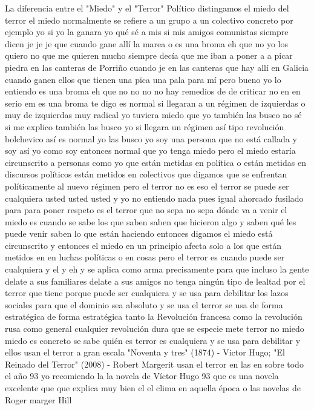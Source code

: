 La diferencia entre el "Miedo" y el "Terror" Político
distingamos el miedo del terror el miedo normalmente se refiere a un grupo a un colectivo concreto por ejemplo yo
si yo la ganara yo qué sé a mis si mis amigos comunistas siempre dicen je je je
que cuando gane allí la marea o es una broma eh que no yo los quiero no que me quieren mucho siempre decía que me iban a poner a a picar piedra
en las canteras de Porriño cuando je en las canteras que hay allí en Galicia cuando ganen ellos que tienen una pica
una pala para mí pero bueno yo lo entiendo es una broma eh que no no
no no hay remedios de de criticar no en en serio em es una broma te digo
es normal si llegaran a un régimen de izquierdas o muy de izquierdas muy radical yo tuviera miedo
que yo también las busco no sé si me explico también las busco yo
si llegara un régimen así tipo revolución bolchevico así es normal yo las busco yo soy una persona que no está callada
y soy así yo como soy entonces normal que yo tenga miedo pero el miedo estaría circunscrito a personas como yo
que están metidas en política o están metidas en discursos políticos están metidos en colectivos que digamos que se enfrentan políticamente al nuevo régimen
pero el terror no es eso el terror se puede ser cualquiera usted usted usted y yo no entiendo nada pues igual
ahorcado fusilado para para poner respeto es el terror que no sepa no sepa dónde va a venir el miedo es cuando se sabe
los que saben saben que hicieron algo y saben qué les puede venir saben lo que están haciendo entonces digamos el miedo está circunscrito
y entonces el miedo en un principio afecta solo a los que están metidos en en luchas políticas o en cosas
pero el terror es cuando puede ser cualquiera y el y eh y se aplica como arma precisamente para que incluso
la gente delate a sus familiares delate a sus amigos no tenga ningún tipo de lealtad por el terror que tiene porque puede ser cualquiera
y se usa para debilitar los lazos sociales para que el dominio sea absoluto y se usa
el terror se usa de forma estratégica de forma estratégica tanto la Revolución francesa como la revolución rusa
como general cualquier revolución dura que se especie mete terror no miedo miedo es concreto se sabe quién es
terror es cualquiera y se usa para debilitar y ellos usan el terror a gran escala
"Noventa y tres" (1874) - Victor Hugo; "El Reinado del Terror" (2008) - Robert Margerit
usan el terror en las en sobre todo el año 93 yo recomiendo la la novela de Víctor Hugo 93
que es una novela excelente que que explica muy bien el el clima en aquella época o las novelas de Roger marger Hill
